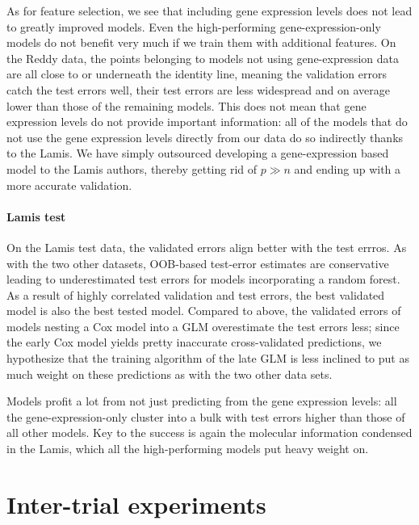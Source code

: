As for feature selection, we see that including gene expression levels does not lead to greatly 
improved models. Even the high-performing gene-expression-only models do not benefit very much if 
we train them with additional features. On the Reddy data, the points belonging to models not using 
gene-expression data are all close to or underneath the identity line, meaning the validation errors 
catch the test errors well, their test errors are less widespread and on average lower than those 
of the remaining models. This does not mean that gene expression levels do not provide important 
information: all of the models that do not use the gene expression levels directly from our data 
do so indirectly thanks to the Lamis. We have simply outsourced developing a gene-expression based 
model to the Lamis authors, thereby getting rid of $p \gg n$ and ending up with a more accurate 
validation.

\paragraph{Lamis test}

On the Lamis test data, the validated errors align better with the test errros. As with the two other 
datasets, OOB-based test-error estimates are conservative leading to underestimated test errors 
for models incorporating a random forest. As a result of highly correlated validation and test 
errors, the best validated model is also the best tested model. Compared to above, the validated errors 
of models nesting a Cox model into a GLM overestimate the test errors less; since the early Cox 
model yields pretty inaccurate cross-validated predictions, we hypothesize that the training 
algorithm of the late GLM is less inclined to put as much weight on these predictions as with the 
two other data sets.

Models profit a lot from not just predicting from the gene expression levels: all the 
gene-expression-only cluster into a bulk with test errors higher than those of all other models. 
Key to the success is again the molecular information condensed in the Lamis, which all the 
high-performing models put heavy weight on.

\section{Inter-trial experiments}

